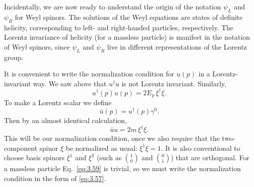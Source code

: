 Incidentally, we are now ready to understand the origin of the notation
$\psi_L$ and $\psi_R$ for Weyl spinors.  The solutions of the Weyl equations
are states of definite helicity, corresponding to left- and right-handed
particles, respectively.  The Lorentz invariance of helicity (for a massless
particle) is manifest in the notation of Weyl spinors, since $\psi_L$ and
$\psi_R$ live in different representations of the Lorentz group.

It is convenient to write the normalization condition for $u(p)$ in a
Lorentz-invariant way.  We saw above that $u^\dagger u$ is not Lorentz
invariant.  Similarly,
\begin{equation}
  u^\dagger(p)u(p) = 2E_p\,\xi^\dagger\xi .
  \label{eq:3.57}
\end{equation}
To make a Lorentz scalar we define
\begin{equation}
  \bar{u}(p) = u^\dagger(p)\gamma^0 .
  \label{eq:3.58}
\end{equation}
Then by an almost identical calculation,
\begin{equation}
  \bar{u}u = 2m\,\xi^\dagger\xi .
  \label{eq:3.59}
\end{equation}
This will be our normalization condition, once we also require that the
two-component spinor $\xi$ be normalized as usual: $\xi^\dagger\xi = 1$.  It
is also conventional to choose basis spinors $\xi^1$ and $\xi^2$ (such as
$\binom{1}{0}$ and $\binom{0}{1}$) that are orthogonal.  For a massless
particle Eq.~\eqref{eq:3.59} is trivial, so we must write the normalization
condition in the form of \eqref{eq:3.57}.

